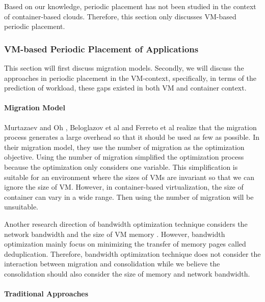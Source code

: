 Based on our knowledge, periodic placement has not been studied in the context of container-based clouds. 
Therefore, this section only discusses VM-based periodic placement.

\subsubsection{VM-based Periodic Placement of Applications}
This section will first discuss migration models. Secondly, we will discuss the approaches in periodic placement in the VM-context, specifically, in terms of the prediction of workload, these gaps existed in both VM and container context. 

\paragraph{Migration Model}
Murtazaev and Oh \cite{Murtazaev:2014eo}, Beloglazov et al \cite{Beloglazov:2012ji} and Ferreto et al \cite{Ferreto:2011iia} realize that the migration process generates a large overhead so that it should be used as few as possible. In their migration model, they use the number of migration as the optimization objective. Using the number of migration simplified the optimization process because the optimization only considers one variable. This simplification is suitable for an environment where the sizes of VMs are invariant so that we can ignore the size of VM. However, in container-based virtualization, the size of container can vary in a wide range. Then using the number of migration will be unsuitable.

Another research direction of  bandwidth optimization technique considers the network bandwidth and the size of VM memory \cite{Deshpande:2012jf, Gerofi:2013bd}. However, bandwidth optimization mainly focus on minimizing the transfer of memory pages called deduplication. Therefore, bandwidth optimization technique does not consider the interaction between migration and consolidation while we believe the consolidation should also consider the size of memory and network bandwidth.

\paragraph{Traditional Approaches}

